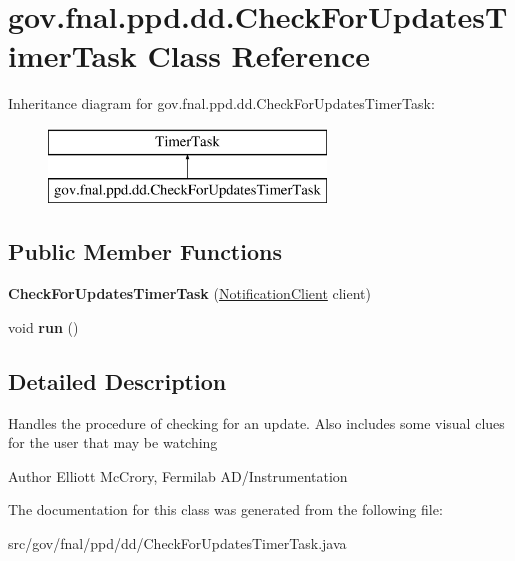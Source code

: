 \hypertarget{classgov_1_1fnal_1_1ppd_1_1dd_1_1CheckForUpdatesTimerTask}{\section{gov.\-fnal.\-ppd.\-dd.\-Check\-For\-Updates\-Timer\-Task Class Reference}
\label{classgov_1_1fnal_1_1ppd_1_1dd_1_1CheckForUpdatesTimerTask}
}
Inheritance diagram for gov.\-fnal.\-ppd.\-dd.\-Check\-For\-Updates\-Timer\-Task\-:\begin{figure}[H]
\begin{center}
\leavevmode
\includegraphics[height=2.000000cm]{classgov_1_1fnal_1_1ppd_1_1dd_1_1CheckForUpdatesTimerTask}
\end{center}
\end{figure}
\subsection*{Public Member Functions}
\begin{DoxyCompactItemize}
\item 
\hypertarget{classgov_1_1fnal_1_1ppd_1_1dd_1_1CheckForUpdatesTimerTask_afc8489823df49540e62221e4c3eb76d8}{{\bfseries Check\-For\-Updates\-Timer\-Task} (\hyperlink{interfacegov_1_1fnal_1_1ppd_1_1dd_1_1util_1_1NotificationClient}{Notification\-Client} client)}\label{classgov_1_1fnal_1_1ppd_1_1dd_1_1CheckForUpdatesTimerTask_afc8489823df49540e62221e4c3eb76d8}

\item 
\hypertarget{classgov_1_1fnal_1_1ppd_1_1dd_1_1CheckForUpdatesTimerTask_adffb4d5d1b38cfadb6ed708cb2b793fe}{void {\bfseries run} ()}\label{classgov_1_1fnal_1_1ppd_1_1dd_1_1CheckForUpdatesTimerTask_adffb4d5d1b38cfadb6ed708cb2b793fe}

\end{DoxyCompactItemize}


\subsection{Detailed Description}
Handles the procedure of checking for an update. Also includes some visual clues for the user that may be watching

\begin{DoxyAuthor}{Author}
Elliott Mc\-Crory, Fermilab A\-D/\-Instrumentation 
\end{DoxyAuthor}


The documentation for this class was generated from the following file\-:\begin{DoxyCompactItemize}
\item 
src/gov/fnal/ppd/dd/Check\-For\-Updates\-Timer\-Task.\-java\end{DoxyCompactItemize}
